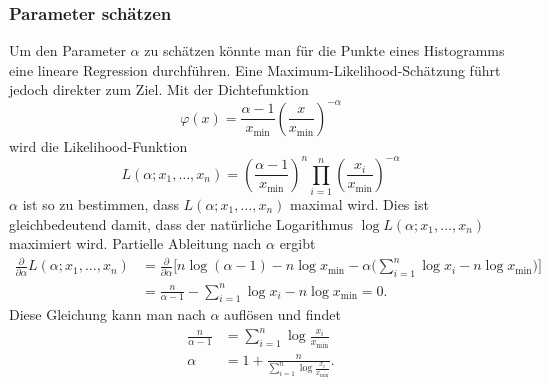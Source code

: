 \subsubsection{Parameter schätzen}
Um den Parameter $\alpha$ zu schätzen könnte man für die Punkte
eines Histogramms eine lineare Regression durchführen.
Eine Maximum-Likelihood-Schätzung führt jedoch direkter zum
Ziel.
Mit der Dichtefunktion
\[
\varphi(x)=\frac{\alpha-1}{x_{\min}}\left(\frac{x}{x_{\min}}\right)^{-\alpha}
\]
wird die Likelihood-Funktion
\[
L(\alpha;x_1,\dots,x_n)=
\left(\frac{\alpha-1}{x_{\min}}\right)^n
\prod_{i=1}^n
\left(\frac{x_i}{x_{\min}}\right)^{-\alpha}
\]
$\alpha$ ist so zu bestimmen, dass $L(\alpha;x_1,\dots,x_n)$ maximal
wird.
Dies ist gleichbedeutend damit, dass der natürliche 
Logarithmus $\log L(\alpha;x_1,\dots,x_n)$ maximiert wird.
Partielle Ableitung nach $\alpha$ ergibt
\begin{align*}
\frac{\partial}{\partial \alpha}
L(\alpha;x_1,\dots,x_n)
&=
\frac{\partial}{\partial\alpha}
\biggl[
n\log(\alpha-1)-n\log x_{\min}
-\alpha\biggl( \sum_{i=1}^n\log x_i-n \log x_{\min}\biggr)
\biggr]
\\
&=
\frac{n}{\alpha-1}-\sum_{i=1}^n\log x_i-n\log x_{\min}=0.
\end{align*}
Diese Gleichung kann man nach $\alpha$ auflösen und findet
\begin{align*}
\frac{n}{\alpha-1}
&=
\sum_{i=1}^n \log\frac{x_i}{x_{\min}}
\\
\alpha&=1+\frac{n}{
\sum_{i=1}^n \log\frac{x_i}{x_{\min}}
}.
\end{align*}


